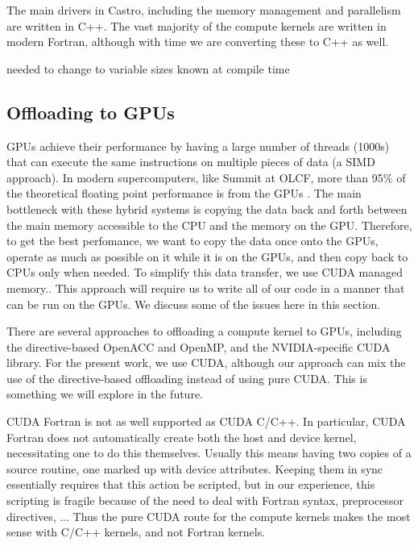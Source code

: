 \documentclass[preprint,times]{aastex62}
\newcommand{\MarginPar}[1]{\marginpar{\vskip-\baselineskip\raggedright\tiny\sffamily\hrule\smallskip{\color{red}#1}\par\smallskip\hrule}}
\begin{document}
The main drivers in Castro, including the memory management and
parallelism are written in C++.  The vast majority of the compute
kernels are written in modern Fortran, although with time we are
converting these to C++ as well.

needed to change to variable sizes known at compile time

\subsection{Offloading to GPUs}

GPUs achieve their performance by having a large number of threads
(1000s) that can execute the same instructions on multiple pieces of
data (a SIMD approach). \MarginPar{Max will not like this desciption.}
In modern supercomputers, like Summit at OLCF, more than 95\% of the
theoretical floating point performance is from the
GPUs \MarginPar{cite?}.  The main bottleneck with these hybrid systems
is copying the data back and forth between the main memory accessible
to the CPU and the memory on the GPU.  Therefore, to get the best
perfomance, we want to copy the data once onto the GPUs, operate as
much as possible on it while it is on the GPUs, and then copy back to
CPUs only when needed.  To simplify this data transfer, we use CUDA
managed memory.\MarginPar{more here}.  This approach will require us
to write all of our code in a manner that can be run on the GPUs.  We
discuss some of the issues here in this section.

There are several approaches to offloading a compute kernel to GPUs,
including the directive-based OpenACC and OpenMP, and the
NVIDIA-specific CUDA library.  For the present work, we use CUDA,
although our approach can mix the use of the directive-based
offloading instead of using pure CUDA.  This is something we will
explore in the future.  

CUDA Fortran is not as well supported as CUDA C/C++.  In particular,
CUDA Fortran does not automatically create both the host and device
kernel, necessitating one to do this themselves.  Usually this means
having two copies of a source routine, one marked up with device
attributes.  Keeping them in sync essentially requires that this
action be scripted, but in our experience, this scripting is fragile
because of the need to deal with Fortran syntax, preprocessor
directives, ...  Thus the pure CUDA route for the compute kernels
makes the most sense with C/C++ kernels, and not Fortran kernels.
\end{document}
